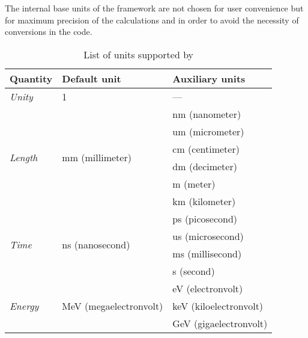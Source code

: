 The internal base units of the framework are not chosen for user convenience but for maximum precision of the calculations and in order to avoid the necessity of conversions in the code.

\begin{table}[tbp]
\caption{List of units supported by \apsq}
\label{tab:units}
\centering
\begin{tabular}{lll}
  \toprule
\textbf{Quantity}                 & \textbf{Default unit}                   & \textbf{Auxiliary units} \\
 \midrule
 \textit{Unity}                   & 1                                       & ---                      \\
 \midrule
 \multirow{6}{*}{\textit{Length}} & \multirow{6}{*}{mm (millimeter)}        & nm (nanometer)           \\
                                  &                                         & um (micrometer)          \\
                                  &                                         & cm (centimeter)          \\
                                  &                                         & dm (decimeter)           \\
                                  &                                         & m (meter)                \\
                                  &                                         & km (kilometer)           \\
 \midrule
\multirow{4}{*}{\textit{Time}}    & \multirow{4}{*}{ns (nanosecond)}        & ps (picosecond)          \\
                                  &                                         & us (microsecond)         \\
                                  &                                         & ms (millisecond)         \\
                                  &                                         & s (second)               \\
\midrule
\multirow{4}{*}{\textit{Energy}}  & \multirow{4}{*}{MeV (megaelectronvolt)} & eV (electronvolt)        \\
                                  &                                         & keV (kiloelectronvolt)   \\
                                  &                                         & GeV (gigaelectronvolt)   \\

\end{tabular}
\end{table}
